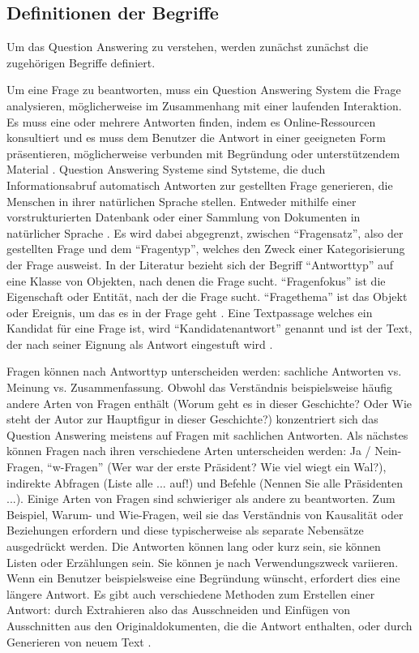 \documentclass[
        ngerman,
        paper=a4,
        numbers=noendperiod,
]{scrreprt}
\begin{document}
\subsection{Definitionen der Begriffe}
Um das Question Answering zu verstehen, werden zunächst zunächst
die zugehörigen Begriffe definiert. 

Um eine Frage zu beantworten, muss ein Question Answering System die Frage analysieren, möglicherweise im Zusammenhang mit einer laufenden Interaktion. Es muss eine oder mehrere Antworten finden, indem es Online-Ressourcen konsultiert und es muss dem Benutzer die Antwort in einer geeigneten Form präsentieren, möglicherweise verbunden mit Begründung oder unterstützendem Material \citep[S. 276]{Hirschman2001NaturalHere}. Question Answering Systeme sind Sytsteme, die duch Informationsabruf automatisch Antworten zur gestellten Frage generieren, die Menschen in ihrer natürlichen Sprache stellen. Entweder mithilfe einer vorstrukturierten Datenbank oder einer Sammlung von Dokumenten in natürlicher Sprache \citep{Chali2011ImprovingKernels}\citep{Dwivedi2013ResearchSystem}\citep{Ansari2016IntelligentNetwork}\citep{Lende2016QuestionTechniques}. Es wird dabei abgegrenzt, zwischen \enquote{Fragensatz}, also der gestellten Frage und dem \enquote{Fragentyp}, welches den Zweck einer Kategorisierung der Frage ausweist. In der Literatur bezieht sich der Begriff \enquote{Antworttyp} auf eine Klasse von Objekten, nach denen die Frage sucht. \enquote{Fragenfokus} ist die Eigenschaft oder Entität, nach der die Frage sucht. \enquote{Fragethema} ist das Objekt oder Ereignis, um das es in der Frage geht \citep[S. 2]{CalijorneSoares2018ASystems}. Eine Textpassage welches ein Kandidat für eine Frage ist, wird \enquote{Kandidatenantwort} genannt und ist der Text, der nach seiner Eignung als Antwort eingestuft wird \citep{RetrievalOpen-DomainQuestion-Answering}.

Fragen können nach Antworttyp unterscheiden werden: sachliche Antworten vs. Meinung vs. Zusammenfassung. Obwohl das Verständnis beispielsweise häufig andere Arten von Fragen enthält (Worum geht es in dieser Geschichte? Oder Wie steht der Autor zur Hauptfigur in dieser Geschichte?) konzentriert sich das Question Answering meistens auf Fragen mit sachlichen Antworten. Als nächstes können Fragen nach ihren verschiedene Arten unterscheiden werden: Ja / Nein-Fragen, \enquote{w-Fragen} (Wer war der erste Präsident? Wie viel wiegt ein Wal?), indirekte Abfragen (Liste alle ... auf!) und Befehle (Nennen Sie alle Präsidenten ...). Einige Arten von Fragen sind schwieriger als andere zu beantworten. Zum Beispiel, Warum- und Wie-Fragen, weil sie das Verständnis von Kausalität oder Beziehungen erfordern und diese typischerweise als separate Nebensätze ausgedrückt werden. Die Antworten können lang oder kurz sein, sie können Listen oder Erzählungen sein. Sie können je nach Verwendungszweck variieren. Wenn ein Benutzer beispielsweise eine Begründung wünscht, erfordert dies eine längere Antwort. Es gibt auch verschiedene Methoden zum Erstellen einer Antwort: durch Extrahieren also das Ausschneiden und Einfügen von Ausschnitten aus den Originaldokumenten, die die Antwort enthalten, oder durch Generieren von neuem Text \citep [S. 277-278]{Hirschman2001NaturalHere}. 
\end{document}
